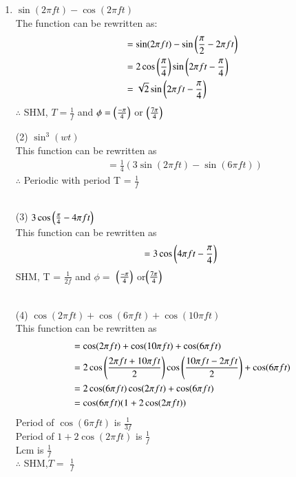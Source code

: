 \documentclass[journal,12pt,twocolumn]{IEEEtran}
\theoremstyle{remark}
\begin{document}
   \begin{enumerate}
   \begin{table}[!ht]
    \centering
        
    \caption{input parameters}
    \label{tab:}
\end{table}
\item $\sin(2\pi f t)- \cos(2\pi f t)$\\
The function can be rewritten as:
 \begin{align}
  &= \sin(2\pi f t) - \sin\left(\frac{\pi}{2} - 2\pi f t\right)\\
  &=2 \cos\left(\frac{\pi}{4}\right) \sin\left(2\pi f t - \frac{\pi}{4}\right)\\
  &=\sqrt{2}\sin\left(2\pi f t - \frac{\pi}{4}\right)
 \end{align}
 \(\therefore\) SHM, \(T = \frac{1}{f}\) and \(\phi = \left(\frac{-\pi}{4}\right)\) or \(\left(\frac{7\pi}{4}\right)\)\\
 

    \item[(2)] $\sin^3(wt)$\\

 This function can be rewritten as\\ 
 \begin{align}
  &=\frac{1}{4}(3\sin(2\pi f t)-\sin(6\pi  f t))
 \end{align}
 $\therefore$ Periodic with period {T} = $\frac{1}{f}$ \\
\\

    \item[(3)] $3\cos\left(\frac{\pi}{4}-4\pi f t\right)$\\

This function can be rewritten as\\ 
 \begin{align}
  =3\cos\left(4\pi f t-\frac{\pi}{4}\right)\\
 \end{align}
 SHM, {T} = $\frac{1}{2f}$  and  $\phi=$  $\left(\frac{-\pi}{4}\right)$ or$\left(\frac{7\pi}{4}\right)$\\
 \\

 \item[(4)]  $\cos(2\pi f t)+\cos(6\pi  f t)+\cos(10\pi  f t)$\\

This function can be rewritten as\\ 
 \begin{align}
  &=\cos(2\pi f t)+\cos(10\pi  f t)+\cos(6\pi  f t)\\
  &=2\cos\left(\frac{2\pi f t+10\pi f t}{2}\right)\cos\left(\frac{10\pi  f t-2\pi f t}{2}\right) +\cos(6\pi f t)\\
  &=2\cos(6\pi  f t) \cos(2\pi f t)+\cos(6\pi  f t)\\
  &=\cos(6\pi  f t) (1+2\cos(2\pi f t))
 \end{align}
 Period of $\cos(6\pi  f t)$ is $\frac{1}{3f}$\\ 
 Period of $1+2\cos(2\pi f t)$ is $\frac{1}{f}$\\ 
 Lcm is $\frac{1}{f}$\\
 $\therefore$  SHM,$T=$ $\frac{1}{f}$\\
 \\


\end{enumerate}
\end{document}
